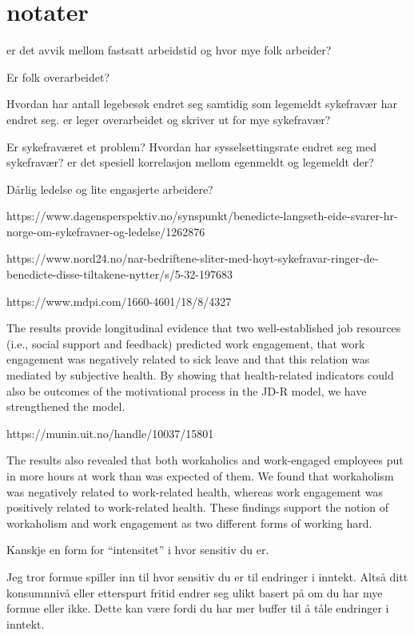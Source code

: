 \documentclass[
  12pt,
  a4paper,
  DIV=11,
  numbers=noendperiod]{scrartcl}
\begin{document}
\section{notater}\label{notater}

er det avvik mellom fastsatt arbeidstid og hvor mye folk arbeider?

Er folk overarbeidet?

Hvordan har antall legebesøk endret seg samtidig som legemeldt
sykefravær har endret seg. er leger overarbeidet og skriver ut for mye
sykefravær?

Er sykefraværet et problem? Hvordan har sysselsettingsrate endret seg
med sykefravær? er det spesiell korrelasjon mellom egenmeldt og
legemeldt der?

Dårlig ledelse og lite engasjerte arbeidere?

https://www.dagensperspektiv.no/synspunkt/benedicte-langseth-eide-svarer-hr-norge-om-sykefravaer-og-ledelse/1262876

https://www.nord24.no/nar-bedriftene-sliter-med-hoyt-sykefravar-ringer-de-benedicte-disse-tiltakene-nytter/s/5-32-197683

https://www.mdpi.com/1660-4601/18/8/4327

The results provide longitudinal evidence that two well-established job
resources (i.e., social support and feedback) predicted work engagement,
that work engagement was negatively related to sick leave and that this
relation was mediated by subjective health. By showing that
health-related indicators could also be outcomes of the motivational
process in the JD-R model, we have strengthened the model.

https://munin.uit.no/handle/10037/15801

The results also revealed that both workaholics and work-engaged
employees put in more hours at work than was expected of them. We found
that workaholism was negatively related to work-related health, whereas
work engagement was positively related to work-related health. These
findings support the notion of workaholism and work engagement as two
different forms of working hard.

Kanskje en form for ``intensitet'' i hvor sensitiv du er.

Jeg tror formue spiller inn til hvor sensitiv du er til endringer i
inntekt. Altså ditt konsumnnivå eller etterspurt fritid endrer seg ulikt
basert på om du har mye formue eller ikke. Dette kan være fordi du har
mer buffer til å tåle endringer i inntekt.
\end{document}
